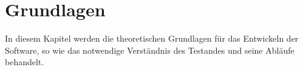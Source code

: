 
\newpage
\section{Grundlagen}

\label{Grundlagen}
In diesem Kapitel werden die theoretischen Grundlagen für das Entwickeln der Software,
so wie das notwendige Verständnis des Testandes und seine Abläufe behandelt.









